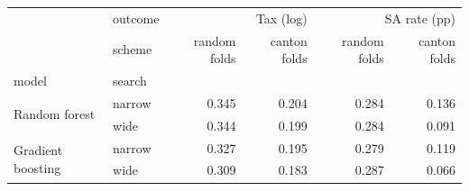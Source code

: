 \begin{tabular}{llrrrr}
\toprule
 & outcome & \multicolumn{2}{r}{Tax (log)} & \multicolumn{2}{r}{SA rate (pp)} \\
 & scheme & random folds & canton folds & random folds & canton folds \\
model & search &  &  &  &  \\
\midrule
\multirow[t]{2}{*}{Random forest} & narrow & 0.345 & 0.204 & 0.284 & 0.136 \\
 & wide & 0.344 & 0.199 & 0.284 & 0.091 \\
\cline{1-6}
\multirow[t]{2}{*}{Gradient boosting} & narrow & 0.327 & 0.195 & 0.279 & 0.119 \\
 & wide & 0.309 & 0.183 & 0.287 & 0.066 \\
\cline{1-6}
\bottomrule
\end{tabular}
